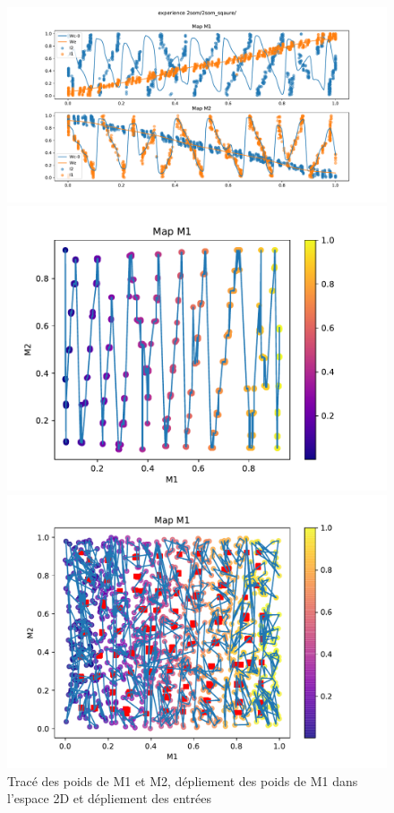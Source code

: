 \begin{figure}[h!]
\begin{minipage}{0.33\textwidth}
\includegraphics[width=\textwidth]{2som_square_w.pdf}
\end{minipage}
\begin{minipage}{0.33\textwidth}
\includegraphics[width=\textwidth]{2som_square_d.pdf}
\end{minipage}
\begin{minipage}{0.33\textwidth}
\includegraphics[width=\textwidth]{2som_square_din.pdf}
\end{minipage}
\label{fig:2som_square}
\caption{Tracé des poids de M1 et M2, dépliement des poids de M1 dans l'espace 2D et dépliement des entrées}
\end{figure}

